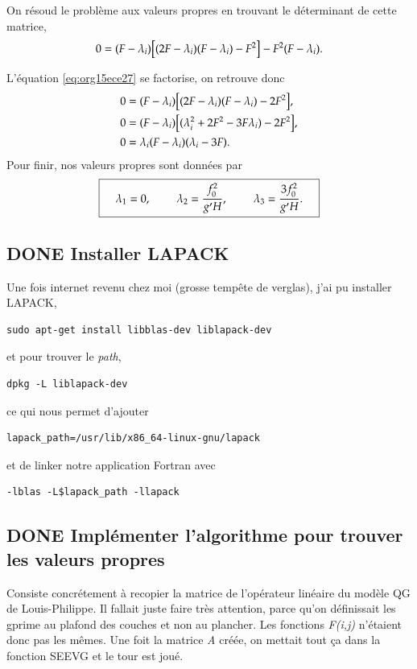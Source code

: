 \documentclass[10pt]{article}
\numberwithin{equation}{section}
\begin{document}
On résoud le problème aux valeurs propres en trouvant le déterminant de cette matrice,
\begin{equation}
\label{eq:org15ece27}
0 = (F-\lambda_i)\qty[(2F - \lambda_i)(F-\lambda_i) - F^2] - F^2(F-\lambda_i).
\end{equation}

L'équation \ref{eq:org15ece27} se factorise, on retrouve donc
\begin{align}
&0 = (F-\lambda_i)\qty[(2F - \lambda_i)(F-\lambda_i) - 2F^2],\nonumber\\
&0 = (F-\lambda_i)\qty[(\lambda^2_i + 2F^2 - 3 F \lambda_i) - 2F^2],\nonumber\\
&0 = \lambda_i \qty(F-\lambda_i)\qty(\lambda_i - 3F).
\end{align}
Pour finir, nos valeurs propres sont données par
\begin{align}
\boxed{\hspace{0.4cm} \lambda_1 = 0,
\hspace{0.8cm} \lambda_2 = \frac{f_0^2}{g' H}, 
\hspace{0.8cm} \lambda_3 = \frac{3 f_0^2}{g'H}. \hspace{0.4cm}}   
\end{align}

\subsection{{\bfseries\sffamily DONE} Installer LAPACK}
\label{sec:org0629e44}
Une fois internet revenu chez moi (grosse tempête de verglas), j'ai pu installer LAPACK,
\begin{verbatim}
sudo apt-get install libblas-dev liblapack-dev
\end{verbatim}
et pour trouver le \emph{path},
\begin{verbatim}
dpkg -L liblapack-dev
\end{verbatim}
ce qui nous permet d'ajouter
\begin{verbatim}
lapack_path=/usr/lib/x86_64-linux-gnu/lapack
\end{verbatim}
et de linker notre application Fortran avec
\begin{verbatim}
-lblas -L$lapack_path -llapack
\end{verbatim}

\subsection{{\bfseries\sffamily DONE} Implémenter l'algorithme pour trouver les valeurs propres}
\label{sec:org596fd0d}
Consiste concrétement à recopier la matrice de l'opérateur linéaire du modèle QG de Louis-Philippe.
Il fallait juste faire très attention, parce qu'on définissait les gprime au plafond des couches et non au plancher.
Les fonctions \emph{F(i,j)} n'étaient donc pas les mêmes.
Une foit la matrice \emph{A} créée, on mettait tout ça dans la fonction SEEVG et le tour est joué.
\end{document}
